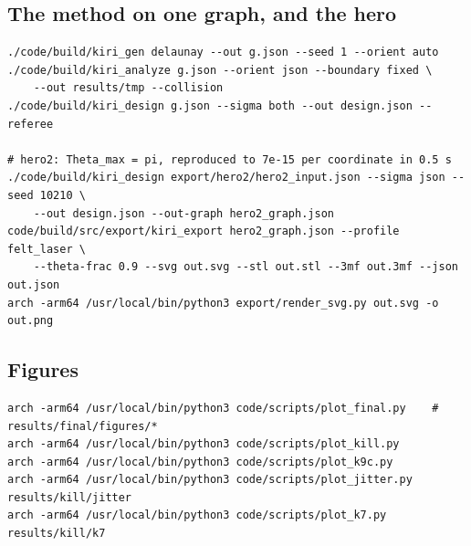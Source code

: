 \documentclass[11pt,a4paper]{article}
\theoremstyle{definition}
\begin{document}
\subsection*{The method on one graph, and the hero}
\begin{verbatim}
./code/build/kiri_gen delaunay --out g.json --seed 1 --orient auto
./code/build/kiri_analyze g.json --orient json --boundary fixed \
    --out results/tmp --collision
./code/build/kiri_design g.json --sigma both --out design.json --referee

# hero2: Theta_max = pi, reproduced to 7e-15 per coordinate in 0.5 s
./code/build/kiri_design export/hero2/hero2_input.json --sigma json --seed 10210 \
    --out design.json --out-graph hero2_graph.json
code/build/src/export/kiri_export hero2_graph.json --profile felt_laser \
    --theta-frac 0.9 --svg out.svg --stl out.stl --3mf out.3mf --json out.json
arch -arm64 /usr/local/bin/python3 export/render_svg.py out.svg -o out.png
\end{verbatim}

\subsection*{Figures}
\begin{verbatim}
arch -arm64 /usr/local/bin/python3 code/scripts/plot_final.py    # results/final/figures/*
arch -arm64 /usr/local/bin/python3 code/scripts/plot_kill.py
arch -arm64 /usr/local/bin/python3 code/scripts/plot_k9c.py
arch -arm64 /usr/local/bin/python3 code/scripts/plot_jitter.py results/kill/jitter
arch -arm64 /usr/local/bin/python3 code/scripts/plot_k7.py results/kill/k7
\end{verbatim}
\end{document}
